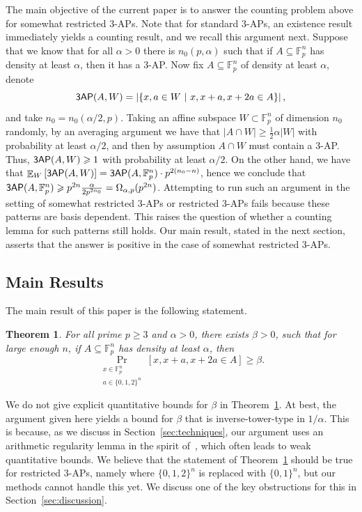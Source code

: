 \documentclass[11pt]{article}
\newtheorem{thm}{Theorem}[section]
\newcommand\card[1]{\left| {#1} \right|}
\newcommand\Prob[2]{{\Pr_{#1}\left[ {#2} \right]}}
\newcommand\Expect[2]{{\mathop{\mathbb{E}}_{#1}\left[ {#2} \right]}}
\renewcommand\geq{\geqslant}
\begin{document}
The main objective of the current paper is to answer the counting problem above for somewhat restricted $3$-APs. Note that for standard $3$-APs, an existence result immediately yields a counting result, and we recall this argument next. Suppose that we know that for all $\alpha>0$ there is $n_0(p,\alpha)$ such that if $A\subseteq \mathbb{F}_p^n$ has density at least $\alpha$, then it has a $3$-AP. Now fix $A\subseteq \mathbb{F}_p^n$ of density at least $\alpha$, denote
\[
{\sf 3AP}(A,W) =
\card{\{x,a\in W~|~x,x+a,x+2a\in A\}},
\]
and take $n_0 = n_0(\alpha/2,p)$. Taking an affine subspace $W\subset\mathbb{F}_p^n$ of dimension $n_0$ randomly, by an averaging argument we have that $\card{A\cap W}\geq \frac{1}{2}\alpha \card{W}$ with probability at least $\alpha/2$, and then by assumption $A\cap W$ must contain a $3$-AP. Thus, 
${\sf 3AP}(A,W)\geq 1$ with probability at least $\alpha/2$. On the other hand, we have that $\Expect{W}{{\sf 3AP}(A,W)}= {\sf 3AP}(A,\mathbb{F}_p^n)\cdot p^{2(n_0-n)}$, hence we conclude that ${\sf 3AP}(A,\mathbb{F}_p^n)\geq p^{2n}\frac{\alpha}{2p^{2n_0}}=\Omega_{\alpha,p}(p^{2n})$.
Attempting to run such an argument in the setting of somewhat restricted $3$-APs or restricted $3$-APs fails because these patterns are basis dependent. This raises the question of whether a counting lemma for such patterns still holds. Our main result, stated in the next section, asserts that the answer is positive in the case of somewhat restricted $3$-APs.

\subsection{Main Results}
The main result of this paper is the following statement.
\begin{thm}\label{thm:main}
    For all prime $p\geq 3$ and $\alpha>0$, there exists $\beta>0$, such that for large enough $n$, if $A\subseteq \mathbb{F}_p^n$ has density at least $\alpha$, then
    \[
    \Prob{\substack{x\in \mathbb{F}_p^n\\ a\in \{0,1,2\}^n}}{x,x+a,x+2a\in A}\geq \beta.
    \]
\end{thm}
We do not give explicit quantitative bounds for $\beta$ in Theorem~\ref{thm:main}. 
At best, the argument given here yields a bound for $\beta$ that is inverse-tower-type in $1/\alpha$. 
This is because, as we discuss in Section~\ref{sec:techniques}, our argument uses an arithmetic regularity lemma in the spirit of~\cite{Green2005SzemerediRegularityAbelianGroups,GreenTao2010ArithmeticRegularity}, which often leads to weak quantitative bounds.
We believe that the statement of Theorem~\ref{thm:main} should be true for restricted $3$-APs, namely where $\{0,1,2\}^n$ is replaced with $\{0,1\}^n$, but our methods cannot handle this yet. We discuss one of the key obstructions for this in Section~\ref{sec:discussion}.
\end{document}
